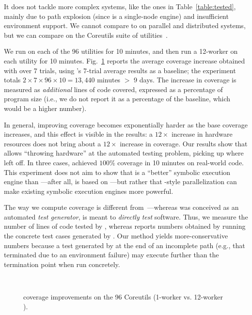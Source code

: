   It does not tackle more complex systems, like the ones in Table~\ref{table:tested}, mainly due to path explosion (since \klee is a single-node engine) and insufficient environment support.  We cannot compare \cnine to \klee on parallel and distributed systems, but we can compare on the Coreutils suite of \unix utilities~\cite{coreutils}.

We run \klee on each of the 96 utilities for 10 minutes, and then  run a 12-worker \cnine on each utility for 10 minutes. Fig.~\ref{fig:coreutils-cov} reports the average coverage increase obtained with \cnine over 7 trials, using \klee's 7-trial average results as a baseline; the experiment totals $2 \times 7 \times 96 \times 10 = 13,440$ minutes $>$ 9 days.  The increase in coverage is measured as {\em additional} lines of code covered, expressed as a percentage of program size (i.e., we do not report it as a percentage of the baseline, which would be a higher number).

  In general, improving coverage becomes exponentially harder as the base coverage increases, and this effect is visible in the results: a $12\times$ increase in hardware resources does not bring about a $12\times$ increase in coverage.  Our results show that \cnine allows ``throwing hardware'' at the automated testing problem, picking up where \klee left off.  In three cases, \cnine achieved $100\%$ coverage in 10 minutes on real-world code.  This experiment does not aim to show that \cnine is a ``better'' symbolic execution engine than \klee---after all, \cnine is based on \klee---but rather that \cnine-style parallelization can make existing symbolic execution engines more powerful.

The way we compute coverage is different from~\cite{klee}---whereas \klee was conceived as an automated {\em test generator}, \cnine is meant to {\em directly test} software. Thus, we measure the number of lines of code tested by \cnine, whereas \cite{klee} reports numbers obtained by running the concrete test cases generated by \klee.  Our method yields more-conservative numbers because a test generated by \klee at the end of an incomplete path (e.g., that terminated due to an environment failure) may execute further than the termination point when run concretely.

\begin{figure}[h!]
  \centering
  \label{fig:coreutils-final-cov} \\
  \label{fig:coreutils-delta-cov}
  \caption{\cnine coverage improvements on the 96 Coreutils (1-worker \cnine vs. 12-worker \cnine).}
  \label{fig:coreutils-cov}
\end{figure}
\fi


